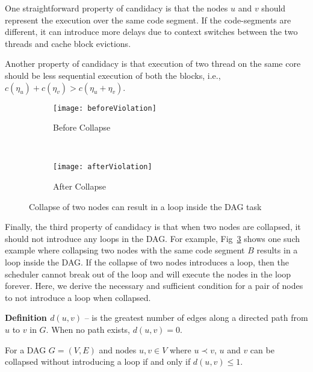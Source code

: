 One straightforward property of candidacy is that the nodes $u$ and $v$ should represent the execution over the same code segment.  If the code-segments are different, it can introduce more delays due to context switches between the two threads and cache block evictions. 

Another property of candidacy is that execution of two thread on the same core should be less sequential execution of both the blocks, i.e., ${c(\eta_u) + c(\eta_v) > c(\eta_u + \eta_v)}$. 

\begin{figure}
  \centering
  \begin{subfigure}[b]{0.48\textwidth}{
      \texttt{[image: beforeViolation]}
      \caption{Before Collapse}
      \label{fig:beforeViolation}
    }
  \end{subfigure}~
  \begin{subfigure}[b]{0.33\textwidth}{
      \texttt{[image: afterViolation]}
      \caption{After Collapse}
      \label{fig:afterViolation}
    }
  \end{subfigure}
  \caption{Collapse of two nodes can result in a loop inside the DAG task}
  \label{fig:dag-violation}
\end{figure}


Finally, the third property of candidacy is that when two nodes are collapsed, it should not introduce any loops in the DAG. For example, Fig~\ref{fig:dag-violation} shows one such example where collapsing two nodes with the same code segment $B$ results in a loop inside the DAG. If the collapse of two nodes introduces a loop, then the scheduler cannot break out of the loop and will execute the nodes in the loop forever. Here, we derive the necessary and sufficient condition for a pair of nodes to not introduce a loop when collapsed.




\textbf{Definition ${d(u, v)}$} -- is the greatest number of edges
along a directed path from ${u}$ to ${v}$ in ${G}$. When no path
exists, ${d(u,v) = 0}$.

\begin{theorem}
  For a DAG ${G = (V, E)}$ and nodes ${u, v \in V}$ where ${u \prec
    v}$, ${u}$ and ${v}$ can be collapsed without introducing a loop
  if and  only if ${d(u, v) \le 1}$.
\end{theorem}


